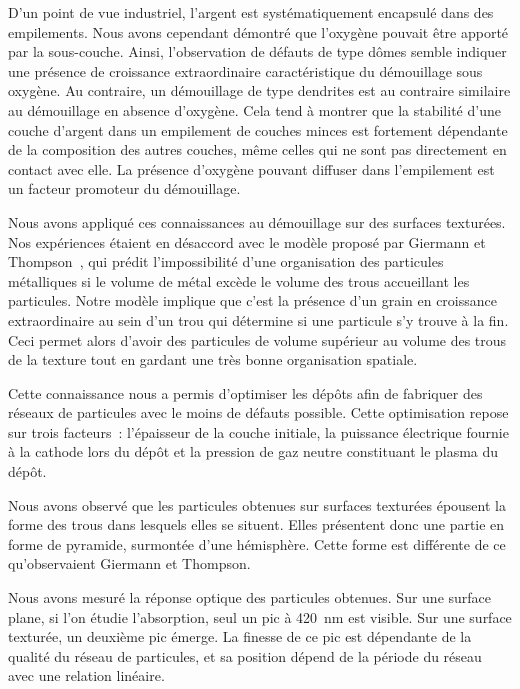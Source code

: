 D'un point de vue industriel, l'argent est systématiquement encapsulé dans des empilements. Nous avons cependant démontré que l'oxygène pouvait être apporté par la sous-couche. Ainsi, l'observation de défauts de type \og dômes \fg{} semble indiquer une présence de croissance extraordinaire caractéristique du démouillage sous oxygène. Au contraire, un démouillage de type \og dendrites \fg{} est au contraire similaire au démouillage en absence d'oxygène. Cela tend à montrer que la stabilité d'une couche d'argent dans un empilement de couches minces est fortement dépendante de la composition des autres couches, même celles qui ne sont pas directement en contact avec elle. La présence d'oxygène pouvant diffuser dans l'empilement est un facteur promoteur du démouillage.\par \vspace{12pt}
Nous avons appliqué ces connaissances au démouillage sur des surfaces texturées. Nos expériences étaient en désaccord avec le modèle proposé par Giermann et Thompson~\cite{giermann2005solid, giermann2011requirements}, qui prédit l'impossibilité d'une organisation des particules métalliques si le volume de métal excède le volume des trous accueillant les particules. Notre modèle implique que c'est la présence d'un grain en croissance extraordinaire au sein d'un trou qui détermine si une particule s'y trouve à la fin. Ceci permet alors d'avoir des particules de volume supérieur au volume des trous de la texture tout en gardant une très bonne organisation spatiale.\par 
Cette connaissance nous a permis d'optimiser les dépôts afin de fabriquer des réseaux de particules avec le moins de défauts possible. Cette optimisation repose sur trois facteurs~: l'épaisseur de la couche initiale, la puissance électrique fournie à la cathode lors du dépôt et la pression de gaz neutre constituant le plasma du dépôt.\par
Nous avons observé que les particules obtenues sur surfaces texturées épousent la forme des trous dans lesquels elles se situent. Elles présentent donc une partie en forme de pyramide, surmontée d'une hémisphère. Cette forme est différente de ce qu'observaient Giermann et Thompson.\par 
Nous avons mesuré la réponse optique des particules obtenues. Sur une surface plane, si l'on étudie l'absorption, seul un pic à 420~nm est visible. Sur une surface texturée, un deuxième pic émerge. La finesse de ce pic est dépendante de la qualité du réseau de particules, et sa position dépend de la période du réseau avec une relation linéaire. \par 
